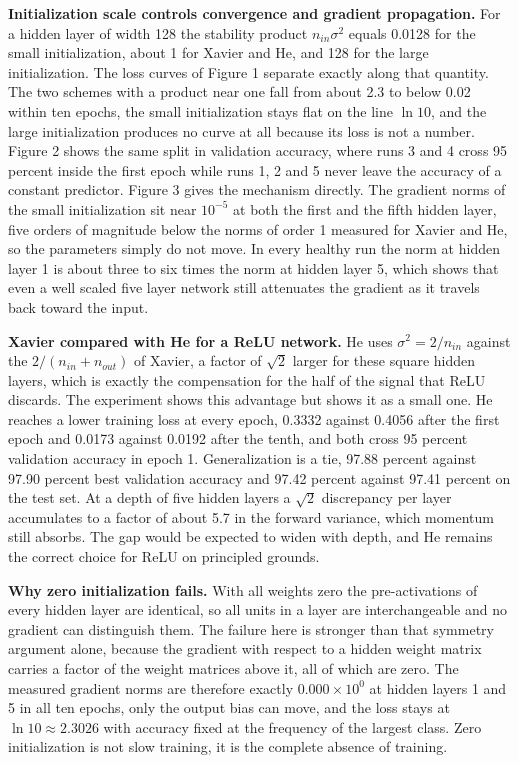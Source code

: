 \documentclass[12pt]{article}
\begin{document}
\textbf{Initialization scale controls convergence and gradient propagation.} For a hidden layer of width 128 the stability product $n_{in}\sigma^2$ equals 0.0128 for the small initialization, about 1 for Xavier and He, and 128 for the large initialization. The loss curves of Figure 1 separate exactly along that quantity. The two schemes with a product near one fall from about 2.3 to below 0.02 within ten epochs, the small initialization stays flat on the line $\ln 10$, and the large initialization produces no curve at all because its loss is not a number. Figure 2 shows the same split in validation accuracy, where runs 3 and 4 cross 95 percent inside the first epoch while runs 1, 2 and 5 never leave the accuracy of a constant predictor. Figure 3 gives the mechanism directly. The gradient norms of the small initialization sit near $10^{-5}$ at both the first and the fifth hidden layer, five orders of magnitude below the norms of order 1 measured for Xavier and He, so the parameters simply do not move. In every healthy run the norm at hidden layer 1 is about three to six times the norm at hidden layer 5, which shows that even a well scaled five layer network still attenuates the gradient as it travels back toward the input.

\textbf{Xavier compared with He for a ReLU network.} He uses $\sigma^2 = 2/n_{in}$ against the $2/(n_{in}+n_{out})$ of Xavier, a factor of $\sqrt{2}$ larger for these square hidden layers, which is exactly the compensation for the half of the signal that ReLU discards. The experiment shows this advantage but shows it as a small one. He reaches a lower training loss at every epoch, 0.3332 against 0.4056 after the first epoch and 0.0173 against 0.0192 after the tenth, and both cross 95 percent validation accuracy in epoch 1. Generalization is a tie, 97.88 percent against 97.90 percent best validation accuracy and 97.42 percent against 97.41 percent on the test set. At a depth of five hidden layers a $\sqrt{2}$ discrepancy per layer accumulates to a factor of about 5.7 in the forward variance, which momentum still absorbs. The gap would be expected to widen with depth, and He remains the correct choice for ReLU on principled grounds.

\textbf{Why zero initialization fails.} With all weights zero the pre-activations of every hidden layer are identical, so all units in a layer are interchangeable and no gradient can distinguish them. The failure here is stronger than that symmetry argument alone, because the gradient with respect to a hidden weight matrix carries a factor of the weight matrices above it, all of which are zero. The measured gradient norms are therefore exactly $0.000 \times 10^{0}$ at hidden layers 1 and 5 in all ten epochs, only the output bias can move, and the loss stays at $\ln 10 \approx 2.3026$ with accuracy fixed at the frequency of the largest class. Zero initialization is not slow training, it is the complete absence of training.
\end{document}
